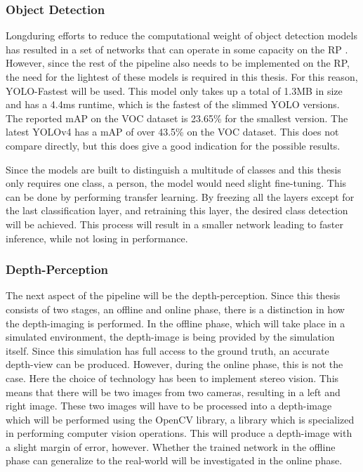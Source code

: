 \subsubsection{Object Detection}
Longduring efforts to reduce the 
computational weight of object detection models has resulted in a set of networks 
that can operate in some capacity on the RP \cite{yolov3-tiny,Mixed-Yolo_Lite,YOLO-Lite}. 
However, 
since the rest of the pipeline also needs to be implemented on the RP, the need for the 
lightest of these models is required in this thesis. For this reason, YOLO-Fastest \cite{YOLO-Lite} 
will be used. This model only takes up a total of 1.3MB in size and has a 4.4ms 
runtime, which is the fastest of the slimmed YOLO versions. The reported mAP on the 
VOC dataset is 23.65\% for the smallest version. 
The latest YOLOv4 \cite{YOLOv4} 
has a mAP of over 43.5\% on the VOC dataset. This does not compare directly, 
but this does give a good indication for the possible results.  

Since the models are built to distinguish a multitude of classes and this thesis 
only requires one class, a person, the model would need slight fine-tuning. This 
can be done by performing transfer learning. By freezing all the layers except 
for the last classification layer, and retraining this layer, the desired class 
detection will be achieved. This process will result in a smaller network leading to 
faster inference, while not losing in performance. 

\subsubsection{Depth-Perception}
The next aspect of the pipeline will be the depth-perception. Since this thesis 
consists of two stages, an offline and online phase, there is a distinction 
in how the depth-imaging is performed. In the offline phase, which will take 
place in a simulated environment, the depth-image is being provided by the 
simulation itself. Since this simulation has full access to the ground truth, an 
accurate depth-view can be produced. However, during the online phase, this is not 
the case. Here the choice of technology has been to implement stereo vision. 
This means that there will be two images from two cameras, resulting in a left and right image.
These two images will have to be processed into a depth-image which
will be performed using the OpenCV library, a library which is 
specialized in performing computer vision operations. This will produce a depth-image 
with a slight margin of error, however. Whether the trained network in the 
offline phase can generalize to the real-world will be investigated 
in the online phase. 

